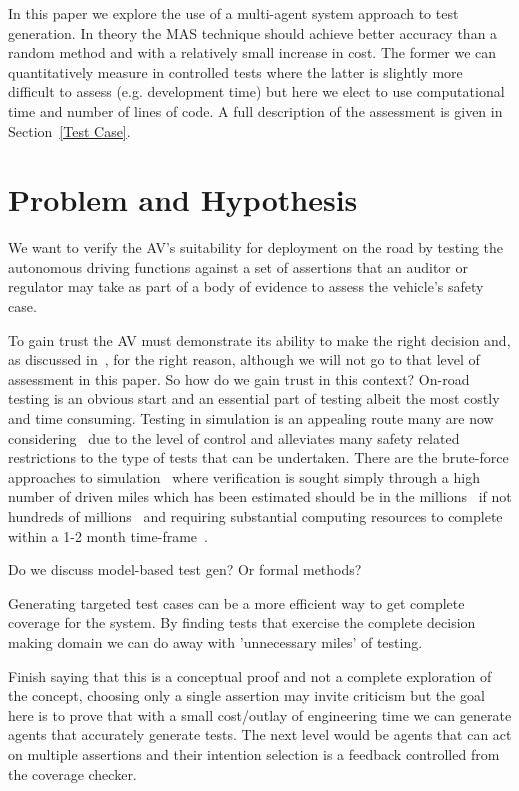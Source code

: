 \documentclass[letterpaper, 10 pt, journal, twoside]{IEEEtran}
\begin{document}
In this paper we explore the use of a multi-agent system approach to test generation. In theory the MAS technique should achieve better accuracy than a random method and with a relatively small increase in cost. The former we can quantitatively measure in controlled tests where the latter is slightly more difficult to assess (e.g. development time) but here we elect to use computational time and number of lines of code. A full description of the assessment is given in Section~\ref{Test Case}.


\section{Problem and Hypothesis}

We want to verify the AV's suitability for deployment on the road by testing the autonomous driving functions against a set of assertions that an auditor or regulator may take as part of a body of evidence to assess the vehicle's safety case.

To gain trust the AV must demonstrate its ability to make the right decision and, as discussed in~\cite{koopman}, for the right reason, although we will not go to that level of assessment in this paper. So how do we gain trust in this context? On-road testing is an obvious start and an essential part of testing albeit the most costly and time consuming. Testing in simulation is an appealing route many are now considering~\cite{refs} due to the level of control and alleviates many safety related restrictions to the type of tests that can be undertaken. There are the brute-force approaches to simulation~\cite{ref} where verification is sought simply through a high number of driven miles which has been estimated should be in the millions~\cite{ref} if not hundreds of millions~\cite{ref} and requiring substantial computing resources to complete within a 1-2 month time-frame~\cite{ref}.

Do we discuss model-based test gen? Or formal methods? 

Generating targeted test cases can be a more efficient way to get complete coverage for the system. By finding tests that exercise the complete decision making domain we can do away with 'unnecessary miles' of testing.

Finish saying that this is a conceptual proof and not a complete exploration of the concept, choosing only a single assertion may invite criticism but the goal here is to prove that with a small cost/outlay of engineering time we can generate agents that accurately generate tests. The next level would be agents that can act on multiple assertions and their intention selection is a feedback controlled from the coverage checker.
\end{document}

